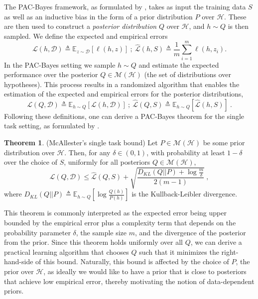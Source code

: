 \documentclass{article} %
\theoremstyle{definition}
\newtheorem{theorem}{Theorem}[section]
\newcommand{\Expect}[2]{\mathbb{E}_{#1}\left [#2 \right ]}
\begin{document}
The PAC-Bayes framework, as formulated by \citet{Mcallester}, takes as input the training data $S$ as well as an inductive bias in the form of a prior distribution $P$ over $\mathcal{H}$. These are then used to construct a \emph{posterior distribution} $Q$ over $\mathcal{H}$, and $h\sim Q$ is then sampled. We define the expected and empirical errors
\begin{equation*}
    \mathcal{L}(h, \mathcal{D}) \triangleq \Expect{z\sim \mathcal{D}}{\ell(h,z)} ~;~ \hat{\mathcal{L}}(h, S)\triangleq \frac{1}{m}\sum_{i=1}^{m} \ell(h,z_i) .
\end{equation*}
In the PAC-Bayes setting we sample $h\sim Q$ and estimate the expected performance over the posterior $Q\in \mathcal{M}(\mathcal{H})$ (the set of distributions over hypotheses). This process results in a randomized algorithm that enables the estimation of the expected and empirical errors for the posterior distributions, 
\begin{equation*}
    \mathcal{L}(Q, \mathcal{D}) \triangleq \Expect{h\sim Q}{\mathcal{L}(h, \mathcal{D})} ~;~ 
    \hat{\mathcal{L}}(Q, S) \triangleq \Expect{h\sim Q}{\hat{\mathcal{L}}(h, S)}~.
\end{equation*}
Following these definitions, one can derive a PAC-Bayes theorem for the single task setting, as formulated by \citet{Mcallester}. 
%
\begin{theorem} (McAllester's single task bound) \label{thm:classic-pb}
	Let $P\in \mathcal{M}(\mathcal{H})$ be some prior distribution over $\mathcal{H}$. Then, 
	for any $\delta \in (0,1)$, with probability at least $1-\delta$ over the choice of $S$,  
	uniformly for all posteriors $Q\in \mathcal{M}(\mathcal{H})$, $$\mathcal{L}(Q, \mathcal{D}) \leq \hat{\mathcal{L}}(Q, S)+\sqrt{\frac{D_{KL}(Q||P)+\log\frac{m}{\delta}}{2(m-1)}}~, 
	$$
	where $D_{KL}(Q||P)\triangleq \Expect{h\sim Q}{\log\frac{Q(h)}{P(h)}}$ is the Kullback-Leibler divergence.
\end{theorem}
%
This theorem is commonly interpreted as the expected error being upper bounded by the empirical error plus a complexity term that depends on the probability parameter $\delta$, the sample size $m$, and the divergence of the posterior from the prior. Since this theorem holds uniformly over all $Q$, we can derive a practical learning algorithm that chooses $Q$ such that it minimizes the right-hand-side of this bound. Naturally, this bound is affected by the choice of $P$, the prior over $\mathcal{H}$, as ideally we would like to have a prior that is close to posteriors that achieve low empirical error, thereby motivating the notion of data-dependent priors.
\end{document}
